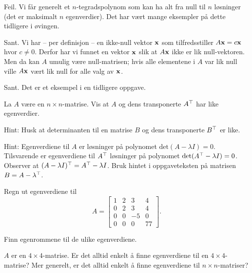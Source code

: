 \begin{losning}

\begin{punkt}
Feil. Vi får generelt et $n$-tegradspolynom som kan ha alt fra null til $n$ løsninger (det er maksimalt $n$ egenverdier). Det har vært mange eksempler på dette tidligere i øvingen.
\end{punkt}

\begin{punkt}
Sant. Vi har -- per definisjon -- en ikke-null vektor $\mathbf{x}$ som tilfredsstiller $A\mathbf{x}=c\mathbf{x}$ hvor $c\neq 0$. Derfor har vi funnet en vektor $\mathbf{x}$ slik at $A\mathbf{x}$ ikke er lik null-vektoren. Men da kan $A$ umulig være null-matrisen; hvis alle elementene i $A$ var lik null ville $A\mathbf{x}$ vært lik null for alle valg av $\mathbf{x}$.
\end{punkt}


\begin{punkt}
Sant. Det er et eksempel i en tidligere oppgave.
\end{punkt}

\end{losning}

\begin{oppgave}
La $A$ være en $n\times n$-matrise. Vis at $A$ og dens transponerte $A^\top$ har like egenverdier.

\noindent
Hint: Husk at determinanten til en matrise $B$ og dens transponerte $B^\top$ er like.
\end{oppgave}

\begin{losning}
Hint: Egenverdiene til $A$ er løsninger på polynomet $\text{det}(A-\lambda I)=0$. Tilsvarende er egenverdiene til $A^\top$ løsninger på polynomet $\text{det}(A^\top-\lambda I)=0$. Observer at $(A-\lambda I)^\top=A^\top-\lambda I$. Bruk hintet i oppgaveteksten på matrisen $B=A-\lambda^\top$.
\end{losning}



\begin{oppgave}
\begin{punkt}
Regn ut egenverdiene til $$A=\begin{bmatrix}
1 & 2 & 3 & 4\\
0 & 2 & 3 & 4\\
0 & 0 & -5 & 0\\
0 & 0 & 0 & 77
\end{bmatrix}.
$$

\end{punkt}

\begin{punkt}
Finn egenrommene til de ulike egenverdiene.
\end{punkt}

\begin{punkt}
$A$ er en $4\times 4$-matrise. Er det alltid enkelt å finne egenverdiene til en $4\times 4$-matrise? Mer generelt, er det alltid enkelt å finne egenverdiene til $n\times n$-matriser?
\end{punkt}

\end{oppgave}


